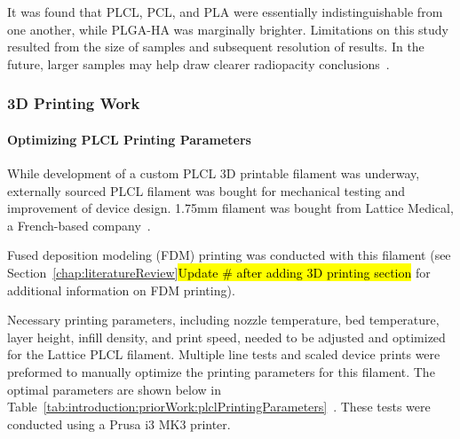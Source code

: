 It was found that PLCL, PCL, and PLA were essentially indistinguishable from one another, while PLGA-HA was marginally brighter. Limitations on this study resulted from the size of samples and subsequent resolution of results. In the future, larger samples may help draw clearer radiopacity conclusions~\cite{RefWorks:RefID:371-bakhtardesign}.

\subsubsection{3D Printing Work\label{sec:introduction:priorWork:otherTeamWork:3dPrinting}}

\paragraph*{Optimizing PLCL Printing Parameters\label{sec:introduction:priorWork:otherTeamWork:3dPrinting:plclParameters}}

While development of a custom PLCL 3D printable filament was underway, externally sourced PLCL filament was bought for mechanical testing and improvement of device design. 1.75mm filament was bought from Lattice Medical, a French-based company~\cite{RefWorks:RefID:42-latticemedical}.

Fused deposition modeling (FDM) printing was conducted with this filament (see Section~\ref{chap:literatureReview}\hl{Update \# after adding 3D printing section} for additional information on FDM printing).

Necessary printing parameters, including nozzle temperature, bed temperature, layer height, infill density, and print speed, needed to be adjusted and optimized for the Lattice PLCL filament. Multiple line tests and scaled device prints were preformed to manually optimize the printing parameters for this filament. The optimal parameters are shown below in Table~\ref{tab:introduction:priorWork:plclPrintingParameters}~\cite{RefWorks:RefID:371-bakhtardesign}. These tests were conducted using a Prusa i3 MK3 printer.

